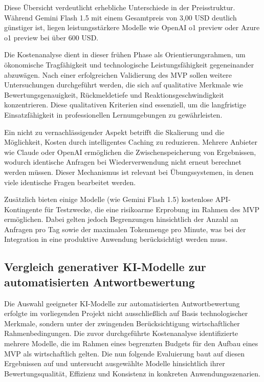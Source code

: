 \documentclass[a4paper,12pt]{article}
\begin{document}
Diese Übersicht verdeutlicht erhebliche Unterschiede in der Preisstruktur. Während Gemini Flash 1.5 mit einem Gesamtpreis von 3,00 USD deutlich günstiger ist, liegen leistungsstärkere Modelle wie OpenAI o1 preview oder Azure o1 preview bei über 600 USD.

Die Kostenanalyse dient in dieser frühen Phase als Orientierungsrahmen, um ökonomische Tragfähigkeit und technologische Leistungsfähigkeit gegeneinander abzuwägen. Nach einer erfolgreichen Validierung des MVP sollen weitere Untersuchungen durchgeführt werden, die sich auf qualitative Merkmale wie Bewertungsgenauigkeit, Rückmeldetiefe und Reaktionsgeschwindigkeit konzentrieren. Diese qualitativen Kriterien sind essenziell, um die langfristige Einsatzfähigkeit in professionellen Lernumgebungen zu gewährleisten.

Ein nicht zu vernachlässigender Aspekt betrifft die Skalierung und die Möglichkeit, Kosten durch intelligentes Caching zu reduzieren. Mehrere Anbieter wie Claude oder OpenAI ermöglichen die Zwischenspeicherung von Ergebnissen, wodurch identische Anfragen bei Wiederverwendung nicht erneut berechnet werden müssen. Dieser Mechanismus ist relevant bei Übungssystemen, in denen viele identische Fragen bearbeitet werden.

Zusätzlich bieten einige Modelle (wie Gemini Flash 1.5) kostenlose API-Kontingente für Testzwecke, die eine risikoarme Erprobung im Rahmen des MVP ermöglichen. Dabei gelten jedoch Begrenzungen hinsichtlich der Anzahl an Anfragen pro Tag sowie der maximalen Tokenmenge pro Minute, was bei der Integration in eine produktive Anwendung berücksichtigt werden muss.

\newpage

\subsection{Vergleich generativer KI-Modelle zur automatisierten Antwortbewertung}
Die Auswahl geeigneter KI-Modelle zur automatisierten Antwortbewertung erfolgte im vorliegenden Projekt nicht ausschließlich auf Basis technologischer Merkmale, sondern unter der zwingenden Berücksichtigung wirtschaftlicher Rahmenbedingungen. Die zuvor durchgeführte Kostenanalyse identifizierte mehrere Modelle, die im Rahmen eines begrenzten Budgets für den Aufbau eines MVP als wirtschaftlich gelten. Die nun folgende Evaluierung baut auf diesen Ergebnissen auf und untersucht ausgewählte Modelle hinsichtlich ihrer Bewertungsqualität, Effizienz und Konsistenz in konkreten Anwendungsszenarien.
\end{document}
